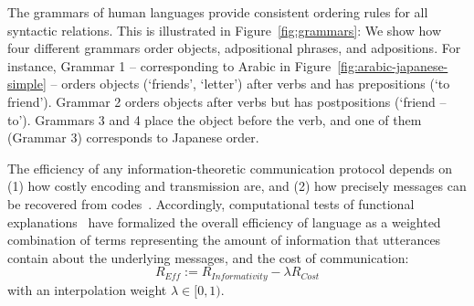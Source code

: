 \documentclass[9pt,twocolumn,twoside,lineno]{pnas-new}
\newcommand{\key}[1]{\textbf{#1}}
\begin{document}
The grammars of human languages provide consistent ordering rules for all syntactic relations.
This is illustrated in Figure~\ref{fig:grammars}:
We show how four different grammars order objects, adpositional phrases, and adpositions.
For instance, Grammar 1 -- corresponding to Arabic in Figure~\ref{fig:arabic-japanese-simple} -- orders objects (`friends', `letter') after verbs and has prepositions (`to friend').
Grammar 2 orders objects after verbs but has postpositions (`friend -- to').
Grammars 3 and 4 place the object before the verb, and one of them (Grammar 3) corresponds to Japanese order.








The efficiency of any information-theoretic communication protocol depends on (1) how costly encoding and transmission are, and (2) how precisely messages can be recovered from codes~\cite{shannon1948mathematical}.
Accordingly, computational tests of functional explanations~\cite{ferreri2003least,frank2012predicting,zaslavsky2018efficient,kemp2012kinship,regier2015word,goodman2013knowledge} have formalized the overall efficiency of language as a weighted combination of terms representing the amount of information that utterances contain about the underlying messages, and the cost of communication:
\begin{equation}\label{eq:efficiency}
	R_{\textit{Eff}} := R_{\textit{Informativity}} - \lambda R_\textit{Cost}
\end{equation}
with an interpolation weight $\lambda \in [0,1)$. %
\end{document}
